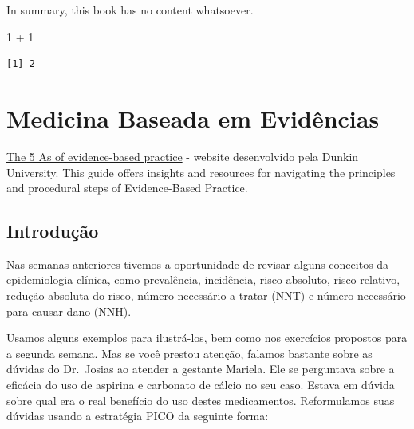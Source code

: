 \documentclass[
  letterpaper,
  DIV=11,
  numbers=noendperiod]{scrreprt}
\newenvironment{Shaded}{\begin{snugshade}}{\end{snugshade}}
\newcommand{\DecValTok}[1]{\textcolor[rgb]{0.68,0.00,0.00}{#1}}
\newcommand{\SpecialCharTok}[1]{\textcolor[rgb]{0.37,0.37,0.37}{#1}}
\begin{document}
In summary, this book has no content whatsoever.

\begin{Shaded}
\begin{Highlighting}[]
\DecValTok{1} \SpecialCharTok{+} \DecValTok{1}
\end{Highlighting}
\end{Shaded}

\begin{verbatim}
[1] 2
\end{verbatim}


\chapter{Medicina Baseada em
Evidências}\label{medicina-baseada-em-eviduxeancias}

\href{https://deakin.libguides.com/ebp/process}{The 5 As of
evidence-based practice} - website desenvolvido pela Dunkin University.
This guide offers insights and resources for navigating the principles
and procedural steps of Evidence-Based Practice.

\section{Introdução}\label{introduuxe7uxe3o}

Nas semanas anteriores tivemos a oportunidade de revisar alguns
conceitos da epidemiologia clínica, como prevalência, incidência, risco
absoluto, risco relativo, redução absoluta do risco, número necessário a
tratar (NNT) e número necessário para causar dano (NNH).

Usamos alguns exemplos para ilustrá-los, bem como nos exercícios
propostos para a segunda semana. Mas se você prestou atenção, falamos
bastante sobre as dúvidas do Dr.~Josias ao atender a gestante Mariela.
Ele se perguntava sobre a eficácia do uso de aspirina e carbonato de
cálcio no seu caso. Estava em dúvida sobre qual era o real benefício do
uso destes medicamentos. Reformulamos suas dúvidas usando a estratégia
PICO da seguinte forma:
\end{document}
